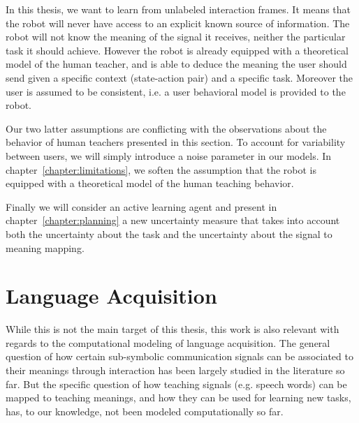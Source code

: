 In this thesis, we want to learn from unlabeled interaction frames. It means that the robot will never have access to an explicit known source of information. The robot will not know the meaning of the signal it receives, neither the particular task it should achieve. However the robot is already equipped with a theoretical model of the human teacher, and is able to deduce the meaning the user should send given a specific context (state-action pair) and a specific task. Moreover the user is assumed to be consistent, i.e. a user behavioral model is provided to the robot.

Our two latter assumptions are conflicting with the observations about the behavior of human teachers presented in this section. To account for variability between users, we will simply introduce a noise parameter in our models. In chapter~\ref{chapter:limitations}, we soften the assumption that the robot is equipped with a theoretical model of the human teaching behavior.

Finally we will consider an active learning agent and present in chapter~\ref{chapter:planning} a new uncertainty measure that takes into account both the uncertainty about the task and the uncertainty about the signal to meaning mapping.

\section{Language Acquisition}
\label{chapter:related:language}

While this is not the main target of this thesis, this work is also relevant with regards to the computational modeling of language acquisition. The general question of how certain sub-symbolic communication signals can be associated to their meanings through interaction has been largely studied in the literature so far. But the specific question of how teaching signals (e.g. speech words) can be mapped to teaching meanings, and how they can be used for learning new tasks, has, to our knowledge, not been modeled computationally so far.


